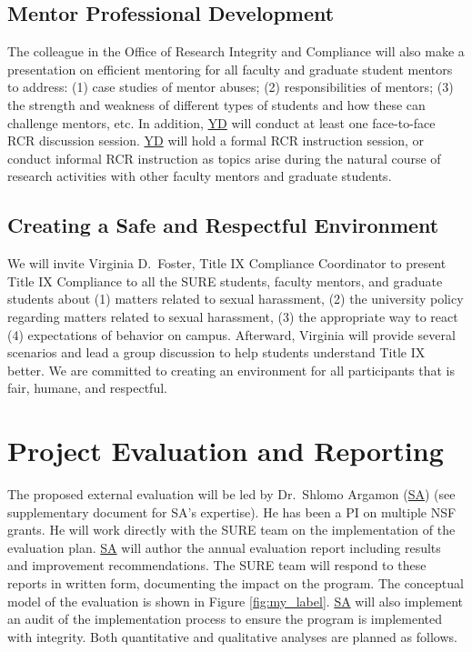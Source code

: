 \documentclass[11pt]{NSFamsart}
\newcommand{\SA}{\hyperlink{SAlink}{SA}\xspace}
\newcommand{\YD}{\hyperlink{YDlink}{YD}\xspace}
\begin{document}
 \subsection{Mentor Professional Development}
The colleague in the Office of Research Integrity and Compliance will also make a presentation on efficient mentoring for all faculty and graduate student mentors to address: (1) case studies
of mentor abuses; (2) responsibilities of mentors; (3) the strength and weakness of different types of
students and how these can challenge mentors, etc. In addition, \YD will conduct at least one face-to-face RCR discussion session. \YD will hold a formal RCR instruction session, or conduct informal RCR instruction as topics arise during the natural course of research activities with other faculty mentors and graduate students. 

\subsection{Creating a Safe and Respectful Environment} 
We will invite Virginia D.\ Foster, Title IX Compliance Coordinator to present Title IX Compliance to all the SURE students, faculty mentors, and graduate students about
(1) matters related to sexual harassment,
(2) the university policy regarding matters related to sexual harassment,
(3) the appropriate way to react
(4) expectations of behavior on campus. Afterward, Virginia will provide several scenarios and lead a group discussion to help students understand Title IX better. We are committed to creating an environment for all participants that is fair, humane, and respectful.

\section{Project Evaluation and Reporting}
The proposed external evaluation will be led by \hypertarget{SAlink}{Dr.~Shlomo Argamon} (\SA) (see supplementary document for
SA’s expertise). He has  been a PI on multiple
NSF grants. He will work directly with the SURE team on the implementation of the evaluation
plan.  \SA will author the annual evaluation report including results and improvement recommendations. The SURE team will respond to these reports in written form, documenting
the impact on the program. The conceptual model of the evaluation is shown in Figure \ref{fig:my_label}. \SA will also implement an audit of the implementation process
to ensure the program is implemented with integrity. Both quantitative and qualitative analyses are
planned as follows.
\end{document}
